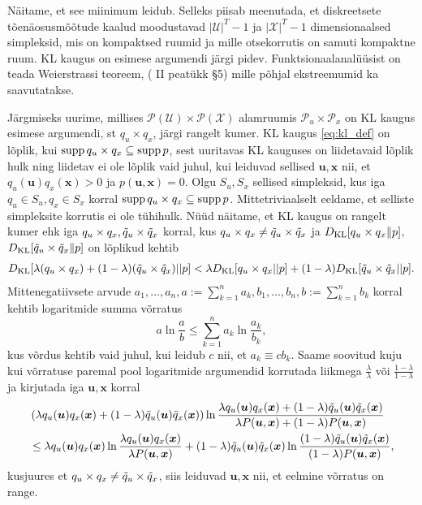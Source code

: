 Näitame, et see miinimum leidub. Selleks piisab meenutada, et diskreetsete tõenäosusmõõtude kaalud moodustavad $|\mathcal{U}|^T-1$ ja $|\mathcal{X}|^T -1$ dimensionaalsed simpleksid, mis on kompaktsed ruumid ja mille otsekorrutis on samuti kompaktne ruum. KL kaugus on esimese argumendi järgi pidev. Funktsionaalanalüüsist on teada Weierstrassi teoreem, (\cite{Oja.1991}{ II peatükk §5}) mille põhjal ekstreemumid ka saavutatakse.

Järgmiseks uurime, millises $\mathcal{P}(\mathcal{U}) \times \mathcal{P}(\mathcal{X})$ alamruumis $\mathcal{P}_u \times \mathcal{P}_x$ on KL kaugus esimese argumendi, st $q_u \times q_x$, järgi rangelt kumer. KL kaugus \eqref{eq:kl_def} on lõplik, kui $\operatorname{supp} q_u \times q_x \subseteq \operatorname{supp} p$, sest uuritavas KL kauguses on liidetavaid lõplik hulk ning liidetav ei ole lõplik vaid juhul, kui leiduvad sellised $\bm{u}, \bm{x}$ nii, et $q_u(\bm{u})q_x(\bm{x}) > 0$ ja $p(\bm{u},\bm{x}) = 0$. Olgu $S_u, S_x$ sellised simpleksid, kus iga $q_u \in S_u, q_x \in S_x$ korral $\operatorname{supp} q_u \times q_x \subseteq \operatorname{supp} p$. Mittetriviaalselt eeldame, et selliste simpleksite korrutis ei ole tühihulk. Nüüd näitame, et KL kaugus on rangelt kumer ehk iga $q_u\times q_x, \Tilde{q}_u\times \Tilde{q}_x$ korral, kus $q_u\times q_x \ne \Tilde{q}_u\times \Tilde{q}_x$ ja $D_{\mathrm{KL}}[q_u \times q_x \| p]$, $D_{\mathrm{KL}}[\Tilde{q}_u \times \Tilde{q}_x \| p]$ on lõplikud kehtib
\begin{align*}
D_{\mathrm{KL}}[\lambda (q_u\times q_x) + (1-\lambda) (\Tilde{q}_u\times \Tilde{q}_x) || p] < \lambda D_{\mathrm{KL}}[q_u\times q_x  || p] + (1 - \lambda) D_{\mathrm{KL}}[\Tilde{q}_u\times \Tilde{q}_x || p].
\end{align*}
Mittenegatiivsete arvude $a_1,\ldots,a_n, a:=\sum_{k=1}^n a_k, b_1,\ldots,b_n, b:=\sum_{k=1}^n b_k$ korral kehtib logaritmide summa võrratus \parencite{wiki:logsum}
$$ a \ln \frac{a}{b} \le \sum_{k=1}^n a_k \ln \frac{a_k}{b_k}, $$
kus võrdus kehtib vaid juhul, kui leidub $c$ nii, et $a_k \equiv cb_k$. Saame soovitud kuju kui võrratuse paremal pool logaritmide argumendid korrutada liikmega $\frac{\lambda}{\lambda}$ või $\frac{1-\lambda}{1-\lambda} $ ja kirjutada iga $\bm{u},\bm{x}$ korral
\begin{align*}
    & \left( \lambda q_u(\bm{u})q_x(\bm{x}) + (1-\lambda) \Tilde{q}_u(\bm{u})\Tilde{q}_x(\bm{x}) \right) \ln \frac{\lambda q_u(\bm{u})q_x(\bm{x}) + (1-\lambda) \Tilde{q}_u(\bm{u})\Tilde{q}_x(\bm{x}) }{\lambda P(\bm{u},\bm{x}) + (1-\lambda)P(\bm{u},\bm{x})}\\
    &\le \lambda q_u(\bm{u})q_x(\bm{x}) \ln \frac{\lambda q_u(\bm{u})q_x(\bm{x})}{\lambda P(\bm{u},\bm{x})} + (1-\lambda)\Tilde{q}_u(\bm{u})\Tilde{q}_x(\bm{x}) \ln \frac{(1-\lambda) \Tilde{q}_u(\bm{u})\Tilde{q}_x(\bm{x})}{(1-\lambda)P(\bm{u},\bm{x})},
\end{align*}
kusjuures et $q_u\times q_x \ne \Tilde{q}_u\times \Tilde{q}_x$, siis leiduvad $\bm{u},\bm{x}$ nii, et eelmine võrratus on range.

